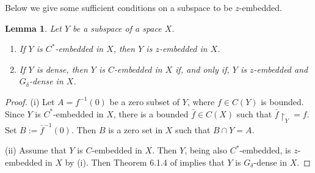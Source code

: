 \documentclass[preprint,11pt]{elsarticle}
\newtheorem{lemma}[theorem]{Lemma}
\numberwithin{equation}{section}
\numberwithin{theorem}{section}
\newcommand{\w}{\omega}
\newcommand{\SM}{{\setminus}}
\begin{document}
Below we give some sufficient conditions on a subspace to be $z$-embedded.
\begin{lemma} \label{l:C-embed-z-embed}
Let $Y$ be a subspace of a space $X$.
\begin{enumerate}
\item[{\rm(i)}] If $Y$ is $C^\ast$-embedded in $X$, then $Y$ is $z$-embedded in $X$.
\item[{\rm(ii)}]  If $Y$ is dense, then $Y$ is $C$-embedded in $X$ if, and only if, $Y$ is $z$-embedded and $G_\delta$-dense in $X$.
\end{enumerate}
\end{lemma}

\begin{proof}
(i) Let $A=f^{-1}(0)$ be a zero subset of $Y$, where $f\in C(Y)$ is bounded. Since $Y$ is $C^\ast$-embedded in $X$, there is a bounded $\bar f\in C(X)$ such that $\bar f{\restriction}_Y=f$. Set $B:={\bar f}^{-1}(0)$. Then $B$ is a zero set in $X$ such that $B \cap Y = A$.
\smallskip

(ii) Assume that $Y$ is $C$-embedded in $X$. Then $Y$, being also $C^\ast$-embedded, is $z$-embedded in $X$ by (i).
Then Theorem 6.1.4 of \cite{ArT} implies that $Y$ is $G_\delta$-dense in $X$.




\end{proof}
\end{document}
